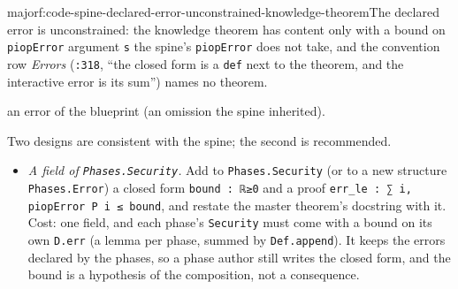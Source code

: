 \begin{finding}{major}{f:code-spine-declared-error-unconstrained-knowledge-theorem}{The declared error is unconstrained: the knowledge theorem has content only with a bound on \texttt{piopError}}
argument \texttt{s} the spine's \texttt{piopError} does not take, and the convention row \emph{Errors} (\texttt{:318}, \enquote{the closed form is a \texttt{def} next to the theorem, and the interactive error is its sum}) names no theorem.

an error of the blueprint (an omission the spine inherited).

Two designs are consistent with the spine; the second is recommended.

\begin{itemize}
\item \emph{A field of \texttt{Phases.\allowbreak{}Security}.} Add to \texttt{Phases.\allowbreak{}Security} (or to a new structure \texttt{Phases.\allowbreak{}Error}) a closed form \texttt{bound : ℝ≥0} and a proof \texttt{e\allowbreak{}r\allowbreak{}r\allowbreak{}\_\allowbreak{}l\allowbreak{}e\allowbreak{} :\allowbreak{} ∑\allowbreak{} i\allowbreak{},\allowbreak{} p\allowbreak{}i\allowbreak{}o\allowbreak{}p\allowbreak{}E\allowbreak{}r\allowbreak{}r\allowbreak{}o\allowbreak{}r\allowbreak{} P\allowbreak{} i\allowbreak{} ≤\allowbreak{} b\allowbreak{}o\allowbreak{}u\allowbreak{}n\allowbreak{}d}, and restate the master theorem's docstring with it. Cost: one field, and each phase's \texttt{Security} must come with a bound on its own \texttt{D.\allowbreak{}err} (a lemma per phase, summed by \texttt{Def.\allowbreak{}append}). It keeps the errors declared by the phases, so a phase author still writes the closed form, and the bound is a hypothesis of the composition, not a consequence.

\end{itemize}
\end{finding}
